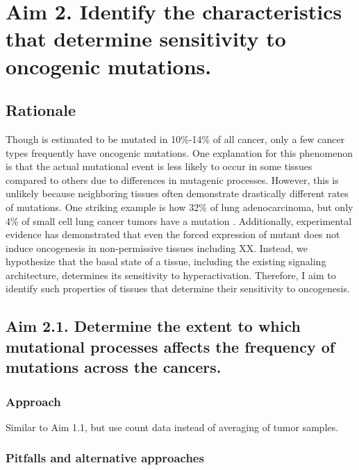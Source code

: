 \section{Aim 2. Identify the characteristics that determine sensitivity to oncogenic \KRAS{} mutations.}

\subsection*{Rationale}

Though \KRAS{} is estimated to be mutated in 10\%-14\% \cite{Bailey2018, Prior2020TheCancer} of all cancer, only a few cancer types frequently have oncogenic \KRAS{} mutations.
One explanation for this phenomenon is that the actual mutational event is less likely to occur in some tissues compared to others due to differences in mutagenic processes.
However, this is unlikely because neighboring tissues often demonstrate drastically different rates of \KRAS mutations.
One striking example is how 32\% of lung adenocarcinoma, but only 4\% of small cell lung cancer tumors have a \KRAS{} mutation \cite{Bailey2018, Prior2020TheCancer}.
Additionally, experimental evidence has demonstrated that even the forced expression of mutant \kras{} does not induce oncogenesis in non-permissive tissues including XX.
Instead, we hypothesize that the basal state of a tissue, including the existing signaling architecture, determines its sensitivity to \KRAS{} hyperactivation.
Therefore, I aim to identify such properties of tissues that determine their sensitivity to \KRAS{} oncogenesis.


\subsection*{Aim 2.1. Determine the extent to which mutational processes affects the frequency of \KRAS{} mutations across the cancers.}

\subsubsection*{Approach}

Similar to Aim 1.1, but use count data instead of averaging of tumor samples.

\subsubsection*{Pitfalls and alternative approaches}

